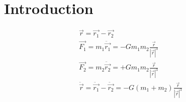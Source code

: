 

\section{Introduction}

\begin{align}\label{eq:Zweikoerperproblem}
\vec{r} = \vec{r_1} - \vec{r_2}\\
\vec{F_1} = m_1 \ddot{\vec{r_1}} = - G m_1 m_2 \frac{\vec{r}}{|\vec{r}|^3}\\
\vec{F_2} = m_2 \ddot{\vec{r_2}} = + G m_1 m_2 \frac{\vec{r}}{|\vec{r}|^3}\\[.25cm]
\ddot{\vec{r}} = \ddot{\vec{r_1}} - \ddot{\vec{r_2}} = - G(m_1 + m_2) \frac{\vec{r}}{|\vec{r}|^3}
\end{align}

